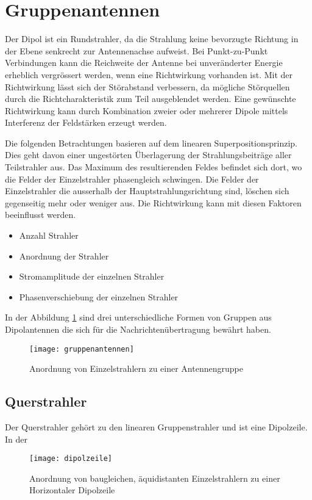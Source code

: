 \section{Gruppenantennen}\label{sec:gruppenantennen}
Der Dipol ist ein Rundstrahler, da die Strahlung keine bevorzugte Richtung in der Ebene senkrecht zur Antennenachse aufweist. Bei Punkt-zu-Punkt Verbindungen kann die Reichweite der Antenne bei unveränderter Energie erheblich vergrössert werden, wenn eine Richtwirkung vorhanden ist. Mit der Richtwirkung lässt sich der Störabstand verbessern, da mögliche Störquellen durch die Richtcharakteristik zum Teil ausgeblendet werden. Eine gewünschte Richtwirkung kann durch Kombination zweier oder mehrerer Dipole mittels Interferenz der Feldstärken erzeugt werden. 

Die folgenden Betrachtungen basieren auf dem linearen Superpositionsprinzip. Dies geht davon einer ungestörten Überlagerung der Strahlungsbeiträge aller Teilstrahler aus. Das Maximum des resultierenden Feldes befindet sich dort, wo die Felder der Einzelstrahler phasengleich schwingen. Die Felder der Einzelstrahler die ausserhalb der Hauptstrahlungsrichtung sind, löschen sich gegenseitig mehr oder weniger aus. Die Richtwirkung kann mit diesen Faktoren beeinflusst werden.

\begin{itemize}
	\item Anzahl Strahler
	\item Anordnung der Strahler
	\item Stromamplitude der einzelnen Strahler
	\item Phasenverschiebung der einzelnen Strahler
\end{itemize}

In der Abbildung \ref{fig:gruppenantennen} sind drei unterschiedliche Formen von Gruppen aus Dipolantennen die sich für die Nachrichtenübertragung bewährt haben. 

\begin{figure}[H]
	\centering
	\texttt{[image: gruppenantennen]}
	\caption{Anordnung von Einzelstrahlern zu einer Antennengruppe}\label{fig:gruppenantennen}
\end{figure}


\subsection{Querstrahler}\label{sec:querstrahler}

Der Querstrahler gehört zu den linearen Gruppenstrahler und ist eine Dipolzeile. In der 

\begin{figure}[H]
	\centering
	\texttt{[image: dipolzeile]}
	\caption{Anordnung von baugleichen, äquidistanten Einzelstrahlern zu einer Horizontaler Dipolzeile }\label{fig:dipolzeile}
\end{figure}